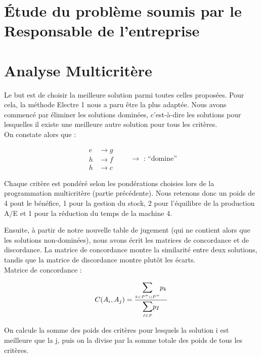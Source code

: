 \documentclass[paper=a4, fontsize=11pt]{report}
\numberwithin{equation}{section}		%
\numberwithin{figure}{section}			%
\numberwithin{table}{section}				%
\begin{document}
\part{\'Etude du problème soumis par le Responsable de l'entreprise}



\part{Analyse Multicritère}

Le but est de choisir la meilleure solution parmi toutes celles proposées. Pour cela, la méthode Electre 1 nous a paru être la plus adaptée.
Nous avons commencé par éliminer les solutions dominées, c’est-à-dire les solutions pour lesquelles il existe une meilleure autre solution pour tous les critères.\\

On constate alors que :

\begin{equation*}
  \left.
    \begin{aligned}
	e & \rightarrow g \\
 h & \rightarrow f \\
 h & \rightarrow c 
    \end{aligned}
  \right. \quad \quad \rightarrow \text{ : “domine”}
\end{equation*}

Chaque critère est pondéré selon les pondérations choisies lors de la programmation multicritère (partie précédente).
Nous retenons donc un poids de 4 pout le bénéfice, 1 pour la gestion du stock, 2 pour l’équilibre de la production A/E et 1 pour la réduction du temps de la machine 4.


Ensuite, à partir de notre nouvelle table de jugement (qui ne contient alors que les solutions non-dominées), nous avons écrit les matrices de concordance et de discordance. La matrice de concordance montre la similarité entre deux solutions, tandis que la matrice de discordance montre plutôt les écarts.\\

Matrice de concordance :

\begin{equation*}
C(A_i, A_j) = \frac{\mathlarger{\mathlarger{\sum}}\limits_{\mathsmaller{k \in P^+ \cup P^=}} p_k}{\mathlarger{\mathlarger{\sum}}\limits_{\mathsmaller{I \in P}} p_I}
\end{equation*} 

On calcule la somme des poids des critères pour lesquels la solution i est meilleure que la j, puis on la divise par la somme totale des poids de tous les critères.\\
\end{document}
